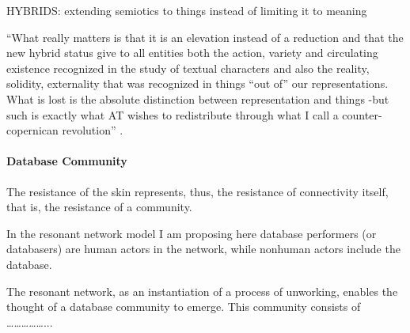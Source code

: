 HYBRIDS: extending semiotics to things instead of limiting it to meaning

``What really matters is that it is an elevation instead of a reduction and that the new hybrid status give to all entities both the action, variety and circulating existence recognized in the study of textual characters and also the reality, solidity, externality that was recognized in things “out of” our representations. What is lost is the absolute distinction between representation and things -but such is exactly what AT wishes to redistribute through what I call a counter-copernican revolution'' \parencite[11]{Lat90:On}.









% 
% 
% 
% 
% 
% 


\paragraph{Database Community}


The resistance of the skin represents, thus, the resistance of connectivity itself, that is, the resistance of a community. 

{
	

	In the resonant network model I am proposing here database performers (or databasers) are human actors in the network, while nonhuman actors include the database. 

% 


	The resonant network, as an instantiation of a process of unworking, enables the thought of a database community to emerge. This community consists of ……………...
}

